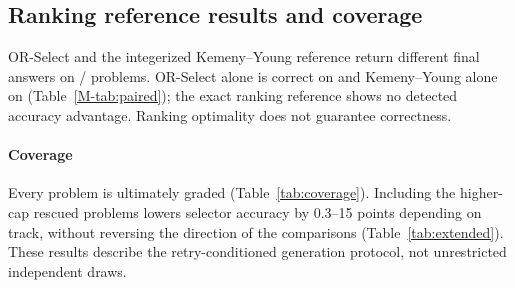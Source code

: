 \subsection{Ranking reference results and coverage}
\label{sec:kemeny-results}

OR-Select and the integerized Kemeny--Young reference return different
final answers on \KYTopOneDiffers/\KYTopOneN{} problems. OR-Select alone
is correct on \KYORwins{} and Kemeny--Young alone on \KYKYwins{}
(Table~\ref{M-tab:paired}); the exact ranking reference shows no detected
accuracy advantage. Ranking optimality does not guarantee correctness.

\paragraph{Coverage}
\label{sec:coverage}

Every problem is ultimately graded (Table~\ref{tab:coverage}). Including
the higher-cap rescued problems lowers selector accuracy by 0.3--15 points
depending on track, without reversing the direction of the comparisons
(Table~\ref{tab:extended}). These results describe the retry-conditioned
generation protocol, not unrestricted independent draws.

